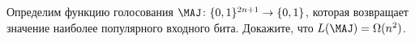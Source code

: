 Определим функцию голосования $\MAJ\colon \{0, 1\}^{2n + 1} \to \{0, 1\}$, которая возвращает значение
наиболее популярного входного бита. Докажите, что $L(\MAJ) = \Omega(n^2)$.
    